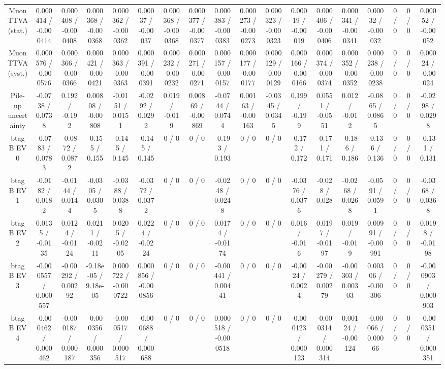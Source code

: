 \documentclass[10pt]{article}
\begin{document}
\begin{table}[htbp]
\begin{center}
\begin{tabular}{|c|c|c|c|c|c|c|c|c|c|c|c|c|c|c|c|c|c|}
  Muon TTVA (stat.) & 0.000414 / -0.000414 & 0.000408 / -0.000408 & 0.000368 / -0.000368 & 0.000362 / -0.000362 & 0.00037 / -0.00037 & 0.000368 / -0.000368 & 0.000377 / -0.000377 & 0.000383 / -0.000383 & 0.000273 / -0.000273 & 0.000323 / -0.000323 & 0.00019 / -0.00019 & 0.000406 / -0.000406 & 0.000341 / -0.000341 & 0.00032 / -0.00032 & 0 / 0 & 0 / 0 & 0.00052 / -0.00052 \\ 
  Muon TTVA (syst.) & 0.000576 / -0.000576 & 0.000366 / -0.000366 & 0.000421 / -0.000421 & 0.000363 / -0.000363 & 0.000391 / -0.000391 & 0.000232 / -0.000232 & 0.000271 / -0.000271 & 0.000157 / -0.000157 & 0.000177 / -0.000177 & 0.000129 / -0.000129 & 0.000166 / -0.000166 & 0.000374 / -0.000374 & 0.000352 / -0.000352 & 0.000238 / -0.000238 & 0 / 0 & 0 / 0 & 0.00024 / -0.00024 \\ 
  Pile-up uncertainty & -0.0738 / 0.0738 & 0.192 / -0.192 & 0.00808 / -0.00808 & -0.0151 / 0.0151 & -0.0292 / 0.0292 & 0.019 / -0.019 & 0.00869 / -0.00869 & -0.0744 / 0.0744 & 0.00163 / -0.00163 & -0.0345 / 0.0345 & 0.199 / -0.199 & 0.0551 / -0.0551 & 0.012 / -0.012 & -0.0865 / 0.0865 & 0 / 0 & 0 / 0 & -0.0298 / 0.0298 \\ 
  btag B EV 0 & -0.0783 / 0.0783 & -0.0872 / 0.0872 & -0.155 / 0.155 & -0.145 / 0.145 & -0.145 / 0.145 & 0 / 0 & 0 / 0 & -0.193 / 0.193 & 0 / 0 & 0 / 0 & -0.172 / 0.172 & -0.171 / 0.171 & -0.186 / 0.186 & -0.136 / 0.136 & 0 / 0 & 0 / 0 & -0.131 / 0.131 \\ 
  btag B EV 1 & -0.0182 / 0.0182 & -0.0144 / 0.0144 & -0.0305 / 0.0305 & -0.0388 / 0.0388 & -0.0372 / 0.0372 & 0 / 0 & 0 / 0 & -0.0248 / 0.0248 & 0 / 0 & 0 / 0 & -0.0376 / 0.0376 & -0.028 / 0.028 & -0.0268 / 0.0268 & -0.0591 / 0.0591 & 0 / 0 & 0 / 0 & -0.0368 / 0.0368 \\ 
  btag B EV 2 & 0.0135 / -0.0135 & 0.0124 / -0.0124 & 0.0211 / -0.0211 & 0.0205 / -0.0205 & 0.0224 / -0.0224 & 0 / 0 & 0 / 0 & 0.0174 / -0.0174 & 0 / 0 & 0 / 0 & 0.016 / -0.016 & 0.0197 / -0.0197 & 0.019 / -0.019 & 0.00991 / -0.00991 & 0 / 0 & 0 / 0 & 0.0198 / -0.0198 \\ 
  btag B EV 3 & -0.000557 / 0.000557 & -0.00292 / 0.00292 & -9.18e-05 / 9.18e-05 & 0.000722 / -0.000722 & 0.000856 / -0.000856 & 0 / 0 & 0 / 0 & -0.00441 / 0.00441 & 0 / 0 & 0 / 0 & -0.0024 / 0.0024 & -0.00279 / 0.00279 & -0.00303 / 0.00303 & 0.00306 / -0.00306 & 0 / 0 & 0 / 0 & -0.000903 / 0.000903 \\ 
  btag B EV 4 & -0.000462 / 0.000462 & -0.000187 / 0.000187 & -0.000356 / 0.000356 & -0.000517 / 0.000517 & -0.000688 / 0.000688 & 0 / 0 & 0 / 0 & 0.000518 / -0.000518 & 0 / 0 & 0 / 0 & -0.000123 / 0.000123 & -0.000314 / 0.000314 & 0.00124 / -0.00124 & -0.00066 / 0.00066 & 0 / 0 & 0 / 0 & -0.000351 / 0.000351 \\ 

\end{tabular}
\end{center}
\end{table}
\end{document}
